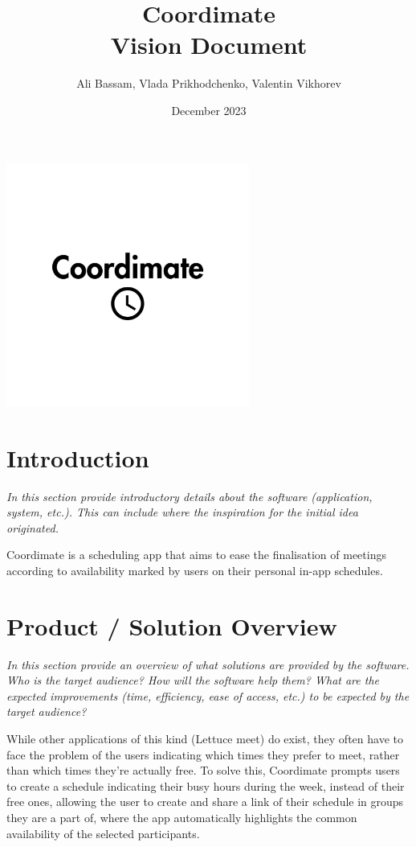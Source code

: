 \documentclass{article}
\title{Coordimate\\Vision Document}
\date{December 2023}
\author{Ali Bassam, Vlada Prikhodchenko, Valentin Vikhorev}
\begin{document}
\maketitle

\begin{center}
\includegraphics[width=8cm]{coordimate-logo}
\end{center}

\section{Introduction}

\textit{In this section provide introductory details about the software
(application, system, etc.). This can include where the inspiration for the
initial idea originated.}

Coordimate is a scheduling app that aims to ease the finalisation of meetings
according to availability marked by users on their personal in-app schedules.

\section{Product / Solution Overview}

\textit{In this section provide an overview of what solutions are provided by
the software. Who is the target audience? How will the software help them? What
are the expected improvements (time, efficiency, ease of access, etc.) to be
expected by the target audience?}

While other applications of this kind (Lettuce meet) do exist, they often have
to face the problem of the users indicating which times they prefer to meet,
rather than which times they’re actually free. To solve this, Coordimate
prompts users to create a schedule indicating their busy hours during the week,
instead of their free ones, allowing the user to create and share a link of
their schedule in groups they are a part of, where the app automatically
highlights the common availability of the selected participants.
\end{document}
